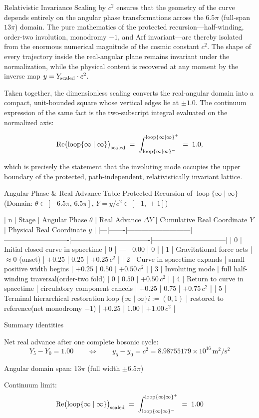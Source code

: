 Relativistic Invariance  
Scaling by \(c^2\) ensures that the geometry of the curve depends entirely on the angular phase transformations across the \(6.5\pi\) (full-span \(13\pi\)) domain. The pure mathematics of the protected recursion—half-winding, order-two involution, monodromy \(-1\), and Arf invariant—are thereby isolated from the enormous numerical magnitude of the cosmic constant \(c^2\). The shape of every trajectory inside the real-angular plane remains invariant under the normalization, while the physical content is recovered at any moment by the inverse map \(y=Y_{\rm scaled}\cdot c^2\).

Taken together, the dimensionless scaling converts the real-angular domain into a compact, unit-bounded square whose vertical edges lie at \(\pm1.0\). The continuum expression of the same fact is the two-subscript integral evaluated on the normalized axis:

\[
\operatorname{Re}\bigl(\operatorname{loop}\{\infty\mid\infty\}\bigr)_{\rm scaled}
\;=\;
\int_{\operatorname{loop}\{\infty\mid\infty\}^{-}}^{\operatorname{loop}\{\infty\mid\infty\}^{+}}
\;=\;
1.0,
\]

which is precisely the statement that the involuting mode occupies the upper boundary of the protected, path-independent, relativistically invariant lattice.

Angular Phase & Real Advance Table  
Protected Recursion of \(\operatorname{loop}\{\infty\mid\infty\}\)  
(Domain: \(\theta\in[-6.5\pi,\,6.5\pi]\), \(Y=y/c^2\in[-1,\,+1]\))

| n | Stage | Angular Phase \(\theta\) | Real Advance \(\Delta Y\) | Cumulative Real Coordinate \(Y\) | Physical Real Coordinate \(y\) |
|---|-------|---------------------------|----------------------------|----------------------------------|--------------------------------|
| 0 | Initial closed curve in spacetime | \(0\) | — | \(0.00\) | \(0\) |
| 1 | Gravitational force acts | \(\approx 0\) (onset) | \(+0.25\) | \(0.25\) | \(+0.25\,c^2\) |
| 2 | Curve in spacetime expands | small positive width begins | \(+0.25\) | \(0.50\) | \(+0.50\,c^2\) |
| 3 | Involuting mode | full half-winding traversal(order-two fold) | \(0\) | \(0.50\) | \(+0.50\,c^2\) |
| 4 | Return to curve in spacetime | circulatory component cancels | \(+0.25\) | \(0.75\) | \(+0.75\,c^2\) |
| 5 | Terminal hierarchical restoration\(\operatorname{loop}\{\infty\mid\infty\}\)\(i:=(0,1)\) | restored to reference(net monodromy \(-1\)) | \(+0.25\) | \(1.00\) | \(+1.00\,c^2\) |

Summary identities

Net real advance after one complete bosonic cycle:  
  \[
  Y_5-Y_0=1.00\qquad\Longleftrightarrow\qquad y_5-y_0=c^2=8.98755179\times10^{16}\,\mathrm{m}^2/\mathrm{s}^2
  \]

Angular domain span: \(13\pi\) (full width \(\pm6.5\pi\))

Continuum limit:  
  \[
  \operatorname{Re}\bigl(\operatorname{loop}\{\infty\mid\infty\}\bigr)_{\rm scaled}
  \;=\;
  \int_{\operatorname{loop}\{\infty\mid\infty\}^{-}}^{\operatorname{loop}\{\infty\mid\infty\}^{+}}
  \;=\;
  1.00
  \]
